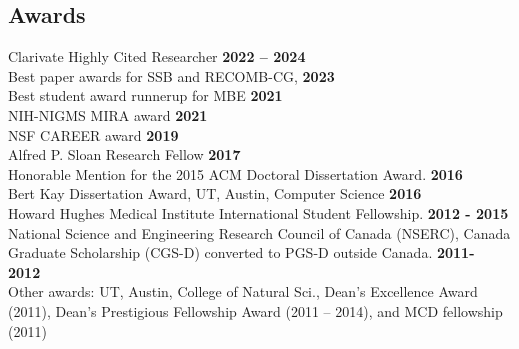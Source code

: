 \documentclass[margin,line,letterpaper]{resume}
\begin{document}
\begin{resume}
    \section{\mysidestyle Awards}
    Clarivate Highly Cited Researcher \hfill \textbf{2022 -- 2024}\vspace{1mm}\\
    Best paper awards for SSB and RECOMB-CG, \hfill \textbf{2023}\vspace{1mm}\\
    Best student award runnerup for MBE \hfill \textbf{2021}\vspace{1mm}\\
    NIH-NIGMS MIRA award \hfill \textbf{ 2021}\vspace{1mm}\\
    NSF CAREER award \hfill \textbf{ 2019}\vspace{1mm}\\
    Alfred P. Sloan Research Fellow\hfill \textbf{ 2017}\vspace{1mm}\\
    Honorable Mention for the 2015 ACM Doctoral Dissertation Award.\hfill \textbf{ 2016}\vspace{1mm}\\
     Bert Kay Dissertation Award, UT,  Austin, Computer Science\hfill \textbf{ 2016}\vspace{1mm}\\
     Howard Hughes Medical Institute International Student Fellowship. \hfill \textbf{2012 - 2015}\vspace{1mm}\\
     National Science and Engineering Research Council of Canada (NSERC), 
      Canada Graduate Scholarship (CGS-D) converted to PGS-D outside Canada. \hfill \textbf{2011- 2012} \\
     Other awards: UT,  Austin, College of Natural Sci., Dean's Excellence Award (2011), Dean's Prestigious Fellowship Award (2011 --  2014), and MCD fellowship (2011) %
    

\end{resume}
\end{document}
